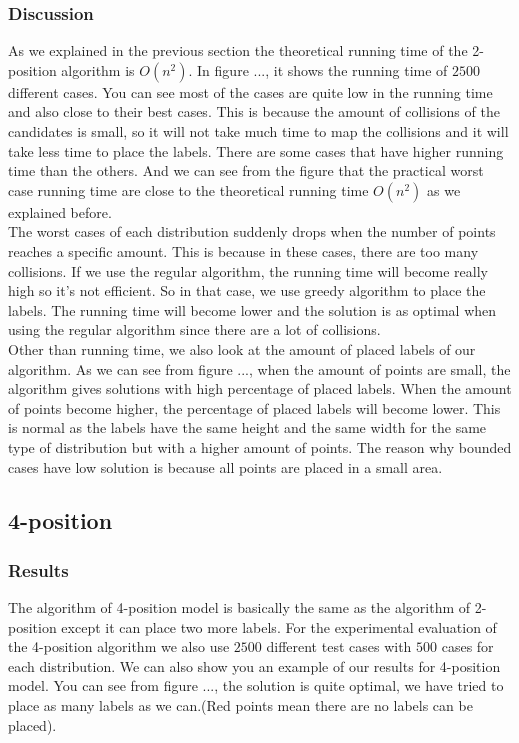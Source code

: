 \documentclass[crop=false,a4paper,oneside,11pt]{standalone}
\begin{document}
\subsubsection{Discussion}
As we explained in the previous section the theoretical running time of the 2-position algorithm is $O(n^2)$. In figure ..., it shows the running time of $2500$ different cases. You can see most of the cases are quite low in the running time and also close to their best cases. This is because the amount of collisions of the candidates is small, so it will not take much time to map the collisions and it will take less time to place the labels. There are some cases that have higher running time than the others. And we can see from the figure that the practical worst case running time are close to the theoretical running time $O(n^2)$ as we explained before. \\
The worst cases of each distribution suddenly drops when the number of points reaches a specific amount. This is because in these cases, there are too many collisions. If we use the regular algorithm, the running time will become really high so it's not efficient. So in that case, we use greedy algorithm to place the labels. The running time will become lower and the solution is as optimal when using the regular algorithm since there are a lot of collisions.\\
Other than running time, we also look at the amount of placed labels of our algorithm. As we can see from figure ..., when the amount of points are small, the algorithm gives solutions with high percentage of placed labels. When the amount of points become higher, the percentage of placed labels will become lower. This is normal as the labels have the same height and the same width for the same type of distribution but with a higher amount of points. The reason why bounded cases have low solution is because all points are placed in a small area.\\

\subsection{4-position}
\subsubsection{Results}
The algorithm of 4-position model is basically the same as the algorithm of 2-position except it can place two more labels. For the experimental evaluation of the 4-position algorithm we also use $2500$ different test cases with $500$ cases for each distribution. We can also show you an example of our results for 4-position model. You can see from figure ..., the solution is quite optimal, we have tried to place as many labels as we can.(Red points mean there are no labels can be placed).
\end{document}
